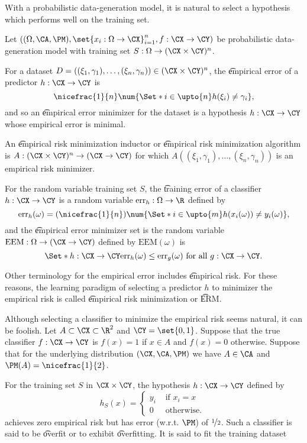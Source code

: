 

With a probabilistic data-generation model, it is natural to select a hypothesis which performs well on the training set.


Let $((\Omega, \CA, \PM), \set{x_i: \Omega \to \CX}_{i=1}^{n}, f: \CX \to \CY)$ be probabilistic data-generation model with training set $S: \Omega \to (\CX \times \CY)^{n}$.


For a dataset $D = ((\xi_1, \gamma_1), \dots, (\xi_n, \gamma_n)) \in (\CX \times \CY)^n$, the \t{empirical error} of a predictor $h: \CX \to \CY$ is
\[
  \nicefrac{1}{n}\num{\Set*{i \in \upto{n}}{h(\xi_i) \neq \gamma_i}},
\]
and so an \t{empirical error minimizer} for the dataset is a hypothesis $h: \CX \to \CY$ whose empirical error is minimal.

An \t{empirical risk minimization inductor} or \t{empirical risk minimization algorithm} is $A: (\CX \times \CY)^n \to (\CX \to \CY)$ for which $A((\xi_1, \gamma_1), \dots, (\xi_n, \gamma_n))$ is an empirical risk minimizer.

For the random variable training set $S$, the \t{training error} of a classifier $h: \CX \to \CY$ is a random variable $\text{err}_h: \Omega \to \R$ defined by
\[
  \text{err}_h(\omega) = (\nicefrac{1}{n})\num{\Set*{i \in \upto{m}}{h(x_i(\omega)) \neq y_i(\omega)}},
\]
and the \t{empirical error minimizer set} is the random variable $\text{EEM}: \Omega \to (\CX \to \CY)$ defined by $\text{EEM}(\omega)$ is
\[
  \Set*{h: \CX \to \CY}{\text{err}_h(\omega) \leq \text{err}_g(\omega) \text{ for all } g: \CX \to \CY}.
\]

Other terminology for the empirical error includes \t{empirical risk}.
For these reasons, the learning paradigm of selecting a predictor $h$ to minimizer the empirical risk is called \t{empirical risk minimization} or \t{ERM}.


Although selecting a classifier to minimize the empirical risk seems natural, it can be foolish.
Let $A \subset \CX \subset \R^2$ and $\CY = \set{0, 1}$.
Suppose that the true classifier $f: \CX \to \CY$ is $f(x) = 1$ if $x \in A$ and $f(x) = 0$ otherwise.
Suppose that for the underlying distribution $(\CX, \CA, \PM)$ we have $A \in \CA$ and $\PM(A) = \nicefrac{1}{2}$.

For the training set $S$ in $\CX \times \CY$, the hypothesis $h: \CX \to \CY$ defined by
\[
	h_S(x) = \begin{cases}
 	y_i & \text{ if } x_i = x \\
 	0 & \text{ otherwise. }
 \end{cases}
\]
achieves zero empirical risk but has error (w.r.t. $\PM$) of $\nicefrac{1}{2}$.
Such a classifier is said to be \t{overfit} or to exhibit \t{overfitting}.
It is said to fit the training dataset 

